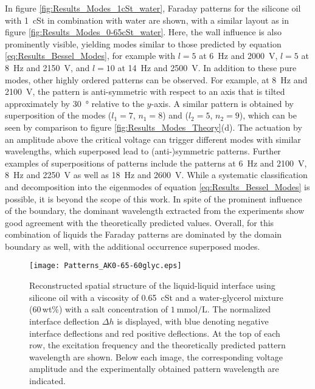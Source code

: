 \documentclass{jfm_arxiv}
\begin{document}
In figure \ref{fig:Results_Modes_1cSt_water}, Faraday patterns for the silicone oil with \SI{1}{\centi St} in combination with water are shown, with a similar layout as in figure \ref{fig:Results_Modes_0-65cSt_water}.
Here, the wall influence is also prominently visible, yielding modes similar to those predicted by equation \ref{eq:Results_Bessel_Modes}, for example with $l=5$ at \SI{6}{\hertz} and \SI{2000}{\volt}, $l=5$ at \SI{8}{\hertz} and \SI{2150}{\volt}, and $l=10$ at \SI{14}{\hertz} and \SI{2500}{\volt}.
In addition to these pure modes, other highly ordered patterns can be observed. For example, at \SI{8}{\hertz} and \SI{2100}{\volt}, the pattern is anti-symmetric with respect to an axis that is tilted approximately by \SI{30}{\degree} relative to the $y$-axis. A similar pattern is obtained by superposition of the modes ($l_1=7$, $n_1=8$) and ($l_2=5$, $n_2=9$), which can be seen by  comparison to figure \ref{fig:Results_Modes_Theory}(d).
The actuation by an amplitude above the critical voltage can trigger different modes with similar wavelengths, which superposed lead to (anti-)symmetric patterns. Further examples of superpositions of patterns include the patterns at \SI{6}{\hertz} and \SI{2100}{\volt}, \SI{8}{\hertz} and \SI{2250}{\volt} as well as \SI{18}{\hertz} and \SI{2600}{\volt}.
While a systematic classification and decomposition into the eigenmodes of equation \ref{eq:Results_Bessel_Modes} is possible, it is beyond the scope of this work.
In spite of the prominent influence of the boundary, the dominant wavelength extracted from the experiments show good agreement with the theoretically predicted values.
Overall, for this combination of liquids the Faraday patterns are dominated by the domain boundary as well, with the additional occurrence superposed modes. 

\begin{figure}
  \centerline{\texttt{[image: Patterns\_AK0-65-60glyc.eps]}}%
  \caption{Reconstructed spatial structure of the liquid-liquid interface using silicone oil with a viscosity of \SI{0.65}{\centi St} and a water-glycerol mixture (\mbox{60\,wt\%}) with a salt concentration of $\SI{1}{\milli\mol\per\liter}$. The normalized interface deflection $\Delta h$ is displayed, with blue denoting negative interface deflections and red positive deflections. At the top of each row, the excitation frequency and the theoretically predicted pattern wavelength are shown. Below each image, the corresponding voltage amplitude and the experimentally obtained pattern wavelength are indicated.
  }
\label{fig:Results_Modes_0-65cSt_glyc60}
\end{figure}
\end{document}
